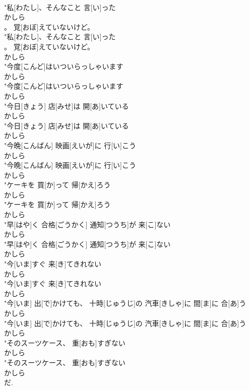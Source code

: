 \documentclass[8pt]{extreport}
\begin{document}
\begin{CJK}{UTF8}{min}
\\	"私[わたし]、そんなこと 言[い]った
\\	かしら
\\	。 覚[おぼ]えていないけど。
\\	"私[わたし]、そんなこと 言[い]った
\\	。 覚[おぼ]えていないけど。
\\	かしら
\\	"今度[こんど]はいついらっしゃいます
\\	かしら
\\	"今度[こんど]はいついらっしゃいます
\\	かしら
\\	"今日[きょう] 店[みせ]は 開[あ]いている
\\	かしら
\\	"今日[きょう] 店[みせ]は 開[あ]いている
\\	かしら
\\	"今晩[こんばん] 映画[えいが]に 行[い]こう
\\	かしら
\\	"今晩[こんばん] 映画[えいが]に 行[い]こう
\\	かしら
\\	"ケーキを 買[か]って 帰[かえ]ろう
\\	かしら
\\	"ケーキを 買[か]って 帰[かえ]ろう
\\	かしら
\\	"早[はや]く 合格[ごうかく] 通知[つうち]が 来[こ]ない
\\	かしら
\\	"早[はや]く 合格[ごうかく] 通知[つうち]が 来[こ]ない
\\	かしら
\\	"今[いま]すぐ 来[き]てきれない
\\	かしら
\\	"今[いま]すぐ 来[き]てきれない
\\	かしら
\\	"今[いま] 出[で]かけても、 十時[じゅうじ]の 汽車[きしゃ]に 間[ま]に 合[あ]う
\\	かしら
\\	"今[いま] 出[で]かけても、 十時[じゅうじ]の 汽車[きしゃ]に 間[ま]に 合[あ]う
\\	かしら
\\	"そのスーツケース、 重[おも]すぎない
\\	かしら
\\	"そのスーツケース、 重[おも]すぎない
\\	かしら
\\	だ. 

\end{CJK}
\end{document}
